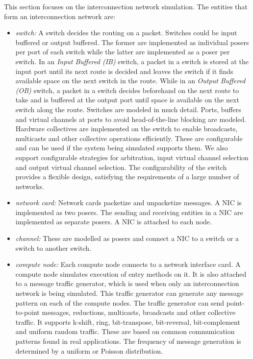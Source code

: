 This section focuses on the interconnection network simulation.
The entities that form an interconnection network are:
\begin{itemize}
\item {\it switch:} A switch decides the routing on a packet. Switches could be
input buffered or output buffered. The former are implemented as individual posers
per port of each switch while the latter are implemented as a poser per switch.
In an {\it Input Buffered (IB)} switch, a packet in a switch is stored at the input 
port until its next route is decided and leaves the switch if it finds 
available space on the next switch in the route.
While in an {\it Output Buffered (OB)} switch, a packet in a switch decides beforehand 
on the next route to take and is buffered at the output port until space is
available on the next switch along the route.
Switches are modeled in much detail. Ports, buffers and
virtual channels at ports to avoid head-of-the-line blocking are
modeled.  Hardware collectives are implemented on the switch to
enable broadcasts, multicasts and other collective operations
efficiently. These are configurable and can be used if the system
being simulated supports them. We also support configurable
strategies for arbitration, input virtual channel selection and output
virtual channel selection. The configurability of the switch
provides a flexible design, satisfying the requirements of
a large number of networks.

\item {\it network card:} Network cards packetize and unpacketize messages.
A NIC is implemented as two posers. The sending and receiving entities in a
NIC are implemented as separate posers. A NIC is attached to each node.
\item {\it channel:} These are modelled as posers and connect a NIC to a switch
or a switch to another switch.
\item {\it compute node:} Each compute node connects to a network interface card.
A compute node simulates execution of entry methods on it. It is also attached
to a message traffic generator, which is used when only an interconnection
network is being simulated. This traffic generator can generate any message
pattern on each of the compute nodes.
The traffic generator can send
point-to-point messages, reductions, multicasts, broadcasts and other
collective traffic.  It supports k-shift, ring, bit-transpose,
bit-reversal, bit-complement and uniform random traffic.
These are based on common communication patterns found in
real applications. The frequency of message generation is determined
by a uniform or Poisson distribution.
\end{itemize}


